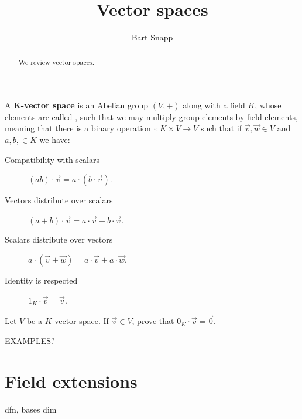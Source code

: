 \documentclass{ximera}
\author{Bart Snapp}
\title{Vector spaces}
\begin{document}
\begin{abstract}
  We review vector spaces.
\end{abstract}
\maketitle



\begin{definition}
  A \textbf{$\boldsymbol{K}$-vector space} is an Abelian group $(V,+)$
  along with a field $K$, whose elements are called ,
  such that we may multiply group elements by field elements, meaning
  that there is a binary operation $\cdot: K\times V \to V$ such that
  if $\vec{v},\vec{w}\in V$ and $a,b,\in K$ we have:
\begin{description}
\item[Compatibility with scalars] $(ab)\cdot \vec{v} = a\cdot (b\cdot \vec{v})$.
\item[Vectors distribute over scalars] $(a+b)\cdot \vec{v} =
  a\cdot\vec{v} + b\cdot \vec{v}$.
\item[Scalars distribute over vectors] $a\cdot (\vec{v}+\vec{w}) =
  a\cdot \vec{v} + a\cdot \vec{w}$.
\item[Identity is respected] $1_K\cdot \vec{v} = \vec{v}$.
\end{description}
\end{definition}

\begin{exercise}
  Let $V$ be a $K$-vector space. If $\vec{v}\in V$, prove that
  $0_K\cdot \vec{v} = \vec{0}$.
\end{exercise}

\begin{exercise}
  EXAMPLES?
\end{exercise}



\begin{definition}
  
\end{definition}


\section{Field extensions}






dfn, bases dim
\end{document}
